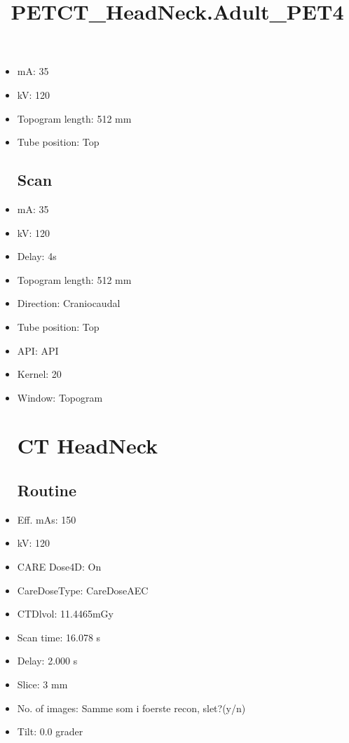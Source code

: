\documentclass[12pt]{article}
\title{PETCT\_HeadNeck.Adult\_PET4}
\begin{document}
\maketitle
\newpage
\tableofcontents
\newpage
{}


\begin{itemize}\section{Topogram}
\subsection{Routine}
\item mA: 35\item kV: 120\item Topogram length: 512 mm\item Tube position: Top
\subsection{Scan}\item mA: 35\item kV: 120\item Delay: 4s\item Topogram length: 512 mm\item Direction: Craniocaudal\item Tube position: Top\item API: API \item Kernel: 20\item Window: Topogram
\section{CT HeadNeck}
\subsection{Routine}
\item Eff. mAs: 150\item kV: 120\item CARE Dose4D: On\item CareDoseType: CareDoseAEC\item CTDlvol: 11.4465mGy\item Scan time: 16.078 s\item Delay: 2.000 s\item Slice: 3 mm\item No. of images: Samme som i foerste recon, slet?(y/n)\item Tilt: 0.0 grader

\end{itemize}
\end{document}
